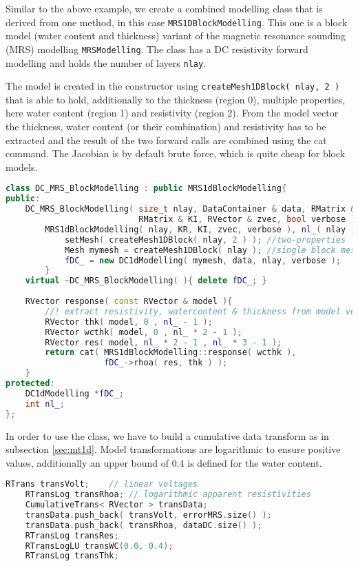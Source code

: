 Similar to the above example, we create a combined modelling class that is derived from one method, in this case \lstinline|MRS1DBlockModelling|.
This one is a block model (water content and thickness) variant of the magnetic resonance sounding (MRS) modelling \lstinline|MRSModelling|.
The class has a DC resistivity forward modelling and holds the number of layers \lstinline|nlay|.

The model is created in the constructor using \lstinline|createMesh1DBlock( nlay, 2 )| that is able to hold, additionally to the thickness (region 0), multiple properties, here water content (region 1) and resistivity (region 2).
From the model vector the thickness, water content (or their combination) and resistivity has to be extracted and the result of the two forward calls are combined using the cat command.
The Jacobian is by default brute force, which is quite cheap for block models.

\begin{lstlisting}[language=C++,morekeywords={RVector,RMatrix}]
class DC_MRS_BlockModelling : public MRS1dBlockModelling{
public:
    DC_MRS_BlockModelling( size_t nlay, DataContainer & data, RMatrix & KR,
                           RMatrix & KI, RVector & zvec, bool verbose ) :
        MRS1dBlockModelling( nlay, KR, KI, zvec, verbose ), nl_( nlay ) { 
            setMesh( createMesh1DBlock( nlay, 2 ) ); //two-properties
            Mesh mymesh = createMesh1DBlock( nlay ); //single block mesh
            fDC_ = new DC1dModelling( mymesh, data, nlay, verbose );
        }
    virtual ~DC_MRS_BlockModelling( ){ delete fDC_; }
    
    RVector response( const RVector & model ){
        //! extract resistivity, watercontent & thickness from model vec
        RVector thk( model, 0 , nl_ - 1 );
        RVector wcthk( model, 0 , nl_ * 2 - 1 );
        RVector res( model, nl_ * 2 - 1 , nl_ * 3 - 1 );
        return cat( MRS1dBlockModelling::response( wcthk ), 
                    fDC_->rhoa( res, thk ) );
    }
protected:
    DC1dModelling *fDC_;
    int nl_;
};
\end{lstlisting}

In order to use the class, we have to build a cumulative data transform as in subsection \ref{sec:mt1d}.
Model transformations are logarithmic to ensure positive values, additionally an upper bound of 0.4 is defined for the water content.
\begin{lstlisting}[language=C++,morekeywords={RVector,RMatrix}]
    RTrans transVolt;    // linear voltages
    RTransLog transRhoa; // logarithmic apparent resistivities
    CumulativeTrans< RVector > transData;
    transData.push_back( transVolt, errorMRS.size() );
    transData.push_back( transRhoa, dataDC.size() );
    RTransLog transRes;
    RTransLogLU transWC(0.0, 0.4);
    RTransLog transThk;
\end{lstlisting}

